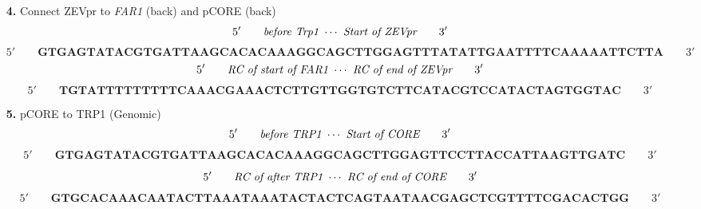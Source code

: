 \documentclass[landscape,a4paper]{article}
\begin{document}
\begin{itemize}
    \item[\textbf{4.}] Connect ZEVpr to \emph{FAR1} (back) and pCORE (back)\\


\[ 5' \qquad \emph{before Trp1 } \cdots \emph{ Start of ZEVpr} \qquad 3' \] 
\[ 5' \qquad \textbf{GTGAGTATACGTGATTAAGCACACAAAGGCAGCTTGGAGTTTATATTGAATTTTCAAAAATTCTTA} \qquad 3' \] 
\[ 5' \qquad \emph{RC of start of FAR1 } \cdots \emph{ RC of end of ZEVpr} \qquad 3' \] 
\[ 5' \qquad \textbf{TGTATTTTTTTTTCAAACGAAACTCTTGTTGGTGTCTTCATACGTCCATACTAGTGGTAC} \qquad 3' \] 

    \item[\textbf{5.}] pCORE to TRP1 (Genomic)\\

        \[ 5' \qquad \emph{before TRP1 } \cdots \emph{ Start of CORE} \qquad 3' \] 
        \[ 5' \qquad  \textbf{GTGAGTATACGTGATTAAGCACACAAAGGCAGCTTGGAGTTCCTTACCATTAAGTTGATC} \qquad 3' \] 


        \[ 5' \qquad \emph{RC of after TRP1 } \cdots \emph{ RC of end of CORE} \qquad 3' \] 
        \[ 5' \qquad  \textbf{GTGCACAAACAATACTTAAATAAATACTACTCAGTAATAACGAGCTCGTTTTCGACACTGG} \qquad 3' \] 

\end{itemize}


\end{document}
